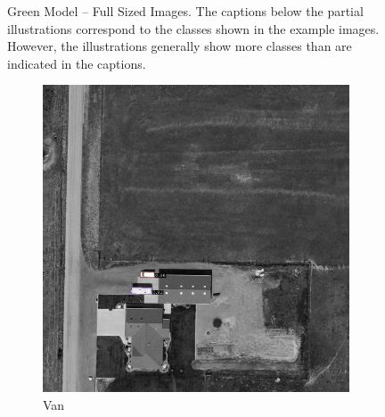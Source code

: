 \begin{figure}[h!]
    \caption[Green Model – Full Sized Images]{Green Model – Full Sized Images. The captions below the partial illustrations correspond to the classes shown in the example images. However, the illustrations generally show more classes than are indicated in the captions.}
    \label{fig:green_ablation_examples_fs}
\end{figure}

\begin{figure}[h!]
    \centering
    \begin{subfigure}[t]{0.38\textwidth}
        \centering
        \includegraphics[width=\linewidth]{images/015Results/03ablation/comp_images/blue/198.png}
        \caption{Van}
    \end{subfigure}
    \begin{subfigure}[t]{0.38\textwidth}
        \centering

\end{subfigure}
\end{figure}
